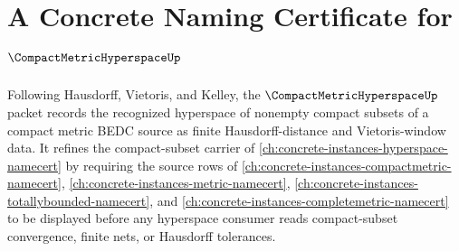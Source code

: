 \chapter{A Concrete Naming Certificate for $\CompactMetricHyperspaceUp$}
\label{ch:concrete-instances-compact-metric-hyperspace-namecert}

Following Hausdorff, Vietoris, and Kelley, the $\CompactMetricHyperspaceUp$ packet records the recognized hyperspace of nonempty compact subsets of a compact metric BEDC source as finite Hausdorff-distance and Vietoris-window data. It refines the compact-subset carrier of \autoref{ch:concrete-instances-hyperspace-namecert} by requiring the source rows of \autoref{ch:concrete-instances-compactmetric-namecert}, \autoref{ch:concrete-instances-metric-namecert}, \autoref{ch:concrete-instances-totallybounded-namecert}, and \autoref{ch:concrete-instances-completemetric-namecert} to be displayed before any hyperspace consumer reads compact-subset convergence, finite nets, or Hausdorff tolerances.


